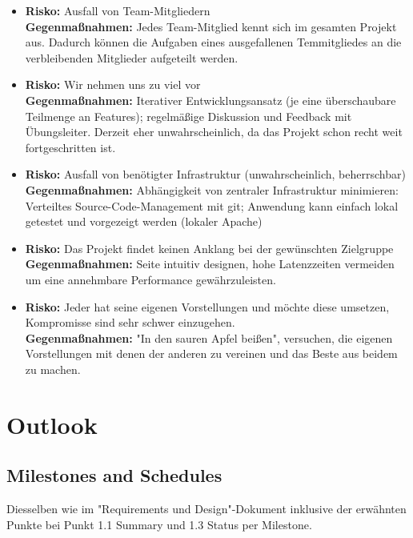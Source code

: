\documentclass{article}
\begin{document}
\begin{itemize}
  \item \textbf{Risko:} Ausfall von Team-Mitgliedern\\
        \textbf{Gegenmaßnahmen:} Jedes Team-Mitglied kennt sich im gesamten Projekt aus. Dadurch können die Aufgaben eines ausgefallenen Temmitgliedes an die verbleibenden Mitglieder aufgeteilt werden.
  \item \textbf{Risko:} Wir nehmen uns zu viel vor \\
        \textbf{Gegenmaßnahmen:} Iterativer Entwicklungsansatz (je eine überschaubare Teilmenge an Features); regelmäßige Diskussion und Feedback mit Übungsleiter. Derzeit eher unwahrscheinlich, da das Projekt schon recht weit fortgeschritten ist.
  \item \textbf{Risko:} Ausfall von benötigter Infrastruktur (unwahrscheinlich, beherrschbar) \\
        \textbf{Gegenmaßnahmen:} Abhängigkeit von zentraler Infrastruktur minimieren: Verteiltes Source-Code-Management mit git; Anwendung kann einfach lokal getestet und vorgezeigt werden (lokaler Apache)
  \item \textbf{Risko:} Das Projekt findet keinen Anklang bei der gewünschten Zielgruppe \\
        \textbf{Gegenmaßnahmen:} Seite intuitiv designen, hohe Latenzzeiten vermeiden um eine annehmbare Performance gewährzuleisten. 
  \item \textbf{Risko:} Jeder hat seine eigenen Vorstellungen und möchte diese umsetzen, Kompromisse sind sehr schwer einzugehen. \\
        \textbf{Gegenmaßnahmen:} "In den sauren Apfel beißen", versuchen, die eigenen Vorstellungen mit denen der anderen zu vereinen und das Beste aus beidem zu machen. 
\end{itemize}




\section{Outlook}

\subsection{Milestones and Schedules}

Diesselben wie im "Requirements und Design"-Dokument inklusive der erwähnten Punkte bei Punkt 1.1 Summary und 1.3 Status per Milestone.
\end{document}
